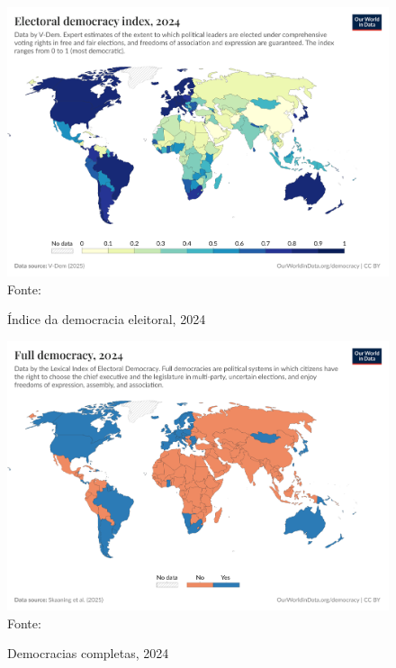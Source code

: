 \begin{figure}[ht]
    \centering
    \caption{Índice da democracia eleitoral, 2024}
    \includegraphics[width=1\linewidth]{figuras/democracia/electoral-democracy-index.png}
    \label{fig:electoral-democracy-index}
    \footnotesize{Fonte: \cite{electoral_democracy_index}}
\end{figure}

\begin{figure}[ht]
    \centering
    \caption{Democracias completas, 2024}
    \includegraphics[width=1\linewidth]{figuras/democracia/full-democracy-lexical.png}
    \label{fig:full-democracy-lexical}
    \footnotesize{Fonte: \cite{full_democracy_lexical}}
\end{figure}

